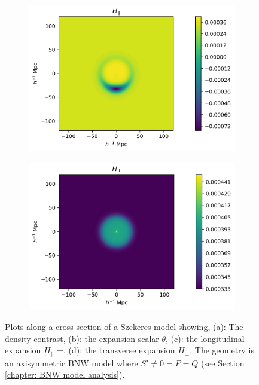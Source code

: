 \documentclass[a4paper,12pt]{report}
\begin{document}
\begin{figure}[t]
\begin{subfigure}[b]{0.45\textwidth}
          \includegraphics[width=\textwidth]{H_para_example.png}
          \subcaption{}
      \end{subfigure}
      \hfill
      \begin{subfigure}[b]{0.45\textwidth}
          \centering
          \includegraphics[width=\textwidth]{H_perp_example.png}
          \subcaption{}
      \end{subfigure}

      \caption{Plots along a cross-section of a Szekeres model showing, (a): The density contrast, (b): the expansion scalar $\theta$, (c): the longitudinal expansion $H_\parallel$ =, (d): the transverse expansion $H_\perp$. The geometry is an axisymmetric BNW model where $S'\neq0=P=Q$ (see Section \ref{chapter: BNW model analysis}).}
      \label{fig: szekeres - expansion plot}
\end{figure}
\end{document}
